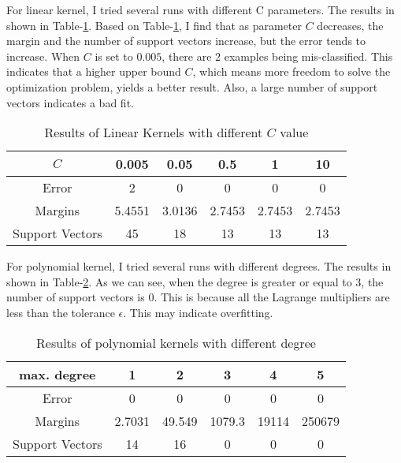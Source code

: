 \documentclass[12pt]{article}
\begin{document}
For linear kernel, I tried several runs with different C parameters. The results in shown in Table-\ref{tab:linear}. Based on Table-\ref{tab:linear}, I find that as parameter $C$ decreases, the margin and the number of support vectors increase, but the error tends to increase. When $C$ is set to $0.005$, there are 2 examples being mis-classified. This indicates that a  higher upper bound $C$, which means more freedom to solve the optimization problem, yields a better result. Also, a large number of support vectors indicates a bad fit. \\

\begin{table}[ht!]
  \begin{center}
    \begin{tabular}{|c|c|c|c|c|c|}
      \hline
      $C$	  &  0.005 &  0.05  &   0.5  &    1   &  10    \\ \hline
      Error       &    2   &   0    &    0   &    0   &   0    \\ \hline
      Margins     & 5.4551 & 3.0136 & 2.7453 & 2.7453 & 2.7453 \\ \hline
      Support Vectors & 45 &  18    &   13   &   13   &   13   \\ \hline
    \end{tabular}
  \end{center}
  \caption{Results of Linear Kernels with different $C$ value 
    \label{tab:linear}}
\end{table}

For polynomial kernel, I tried several runs with different degrees. The results in shown in Table-\ref{tab:poly}. As we can see, when the degree is greater or equal to 3, the number of support vectors is 0. This is because all the Lagrange multipliers are less than the tolerance $\epsilon$. This may indicate overfitting. \\

\begin{table}[ht!]
  \begin{center}
    \begin{tabular}{|c|c|c|c|c|c|}
      \hline
      max. degree &    1   &   2    &    3   &    4   &   5    \\ \hline
      Error       &    0   &   0    &    0   &    0   &   0    \\ \hline
      Margins     & 2.7031 & 49.549 & 1079.3 & 19114  & 250679 \\ \hline
      Support Vectors & 14 &  16    &    0   &    0   &   0    \\ \hline
    \end{tabular}
  \end{center}
  \caption{Results of polynomial kernels with different degree 
    \label{tab:poly}}
\end{table}
\end{document}
